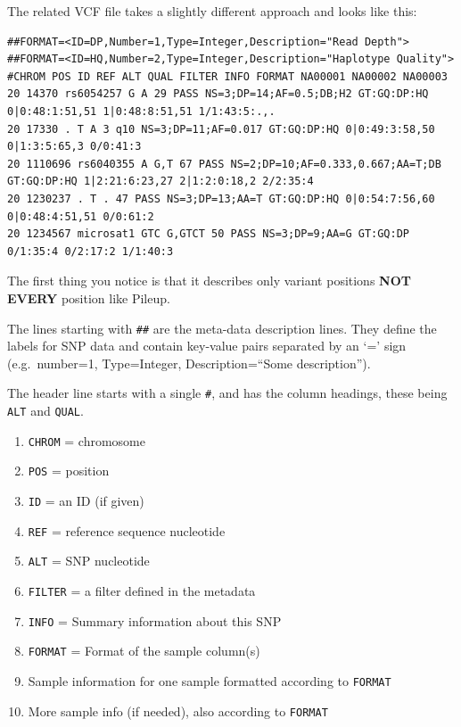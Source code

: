 \documentclass[12pt,]{book}
\providecommand{\tightlist}{%
  \setlength{\itemsep}{0pt}\setlength{\parskip}{0pt}}
\begin{document}
The related VCF file takes a slightly different approach and looks like
this:

\begin{verbatim}
##FORMAT=<ID=DP,Number=1,Type=Integer,Description="Read Depth">
##FORMAT=<ID=HQ,Number=2,Type=Integer,Description="Haplotype Quality">
#CHROM POS ID REF ALT QUAL FILTER INFO FORMAT NA00001 NA00002 NA00003
20 14370 rs6054257 G A 29 PASS NS=3;DP=14;AF=0.5;DB;H2 GT:GQ:DP:HQ 0|0:48:1:51,51 1|0:48:8:51,51 1/1:43:5:.,.
20 17330 . T A 3 q10 NS=3;DP=11;AF=0.017 GT:GQ:DP:HQ 0|0:49:3:58,50 0|1:3:5:65,3 0/0:41:3
20 1110696 rs6040355 A G,T 67 PASS NS=2;DP=10;AF=0.333,0.667;AA=T;DB GT:GQ:DP:HQ 1|2:21:6:23,27 2|1:2:0:18,2 2/2:35:4
20 1230237 . T . 47 PASS NS=3;DP=13;AA=T GT:GQ:DP:HQ 0|0:54:7:56,60 0|0:48:4:51,51 0/0:61:2
20 1234567 microsat1 GTC G,GTCT 50 PASS NS=3;DP=9;AA=G GT:GQ:DP 0/1:35:4 0/2:17:2 1/1:40:3
\end{verbatim}

The first thing you notice is that it describes only variant positions
\textbf{NOT} \textbf{EVERY} position like Pileup.

The lines starting with \texttt{\#\#} are the meta-data description
lines. They define the labels for SNP data and contain key-value pairs
separated by an `=' sign (e.g.~number=1, Type=Integer,
Description=``Some description'').

The header line starts with a single \texttt{\#}, and has the column
headings, these being \texttt{ALT} and \texttt{QUAL}.

\begin{enumerate}
\def\labelenumi{\arabic{enumi}.}
\tightlist
\item
  \texttt{CHROM} = chromosome
\item
  \texttt{POS} = position
\item
  \texttt{ID} = an ID (if given)
\item
  \texttt{REF} = reference sequence nucleotide
\item
  \texttt{ALT} = SNP nucleotide
\item
  \texttt{FILTER} = a filter defined in the metadata
\item
  \texttt{INFO} = Summary information about this SNP
\item
  \texttt{FORMAT} = Format of the sample column(s)
\item
  Sample information for one sample formatted according to
  \texttt{FORMAT}
\item
  More sample info (if needed), also according to \texttt{FORMAT}
\end{enumerate}
\end{document}
